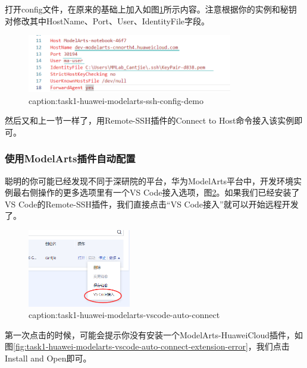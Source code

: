 打开config文件，在原来的基础上加入如图\ref{fig:task1-huawei-modelarts-ssh-config-demo}所示内容。注意根据你的实例和秘钥对修改其中HostName、Port、User、IdentityFile字段。

\begin{figure}[htbp]
	\centering
	\includegraphics[width=0.8\textwidth]{figures/task1-huawei-modelarts-ssh-config-demo.png}
	\caption{caption:task1-huawei-modelarts-ssh-config-demo}
	\label{fig:task1-huawei-modelarts-ssh-config-demo}
\end{figure}

然后又和上一节一样了，用Remote-SSH插件的Connect to Host命令接入该实例即可。

\subsubsection{使用ModelArts插件自动配置}

聪明的你可能已经发现不同于深研院的平台，华为ModelArts平台中，开发环境实例最右侧操作的更多选项里有一个VS Code接入选项，图\ref{fig:task1-huawei-modelarts-vscode-auto-connect}。如果我们已经安装了VS Code的Remote-SSH插件，我们直接点击“VS Code接入”就可以开始远程开发了。
\begin{figure}[htbp]
	\centering
	\includegraphics[width=0.4\textwidth]{figures/task1-huawei-modelarts-vscode-auto-connect.png}
	\caption{caption:task1-huawei-modelarts-vscode-auto-connect}
	\label{fig:task1-huawei-modelarts-vscode-auto-connect}
\end{figure}

第一次点击的时候，可能会提示你没有安装一个ModelArts-HuaweiCloud插件，如图\ref{fig:task1-huawei-modelarts-vscode-auto-connect-extension-error}，我们点击Install and Open即可。




